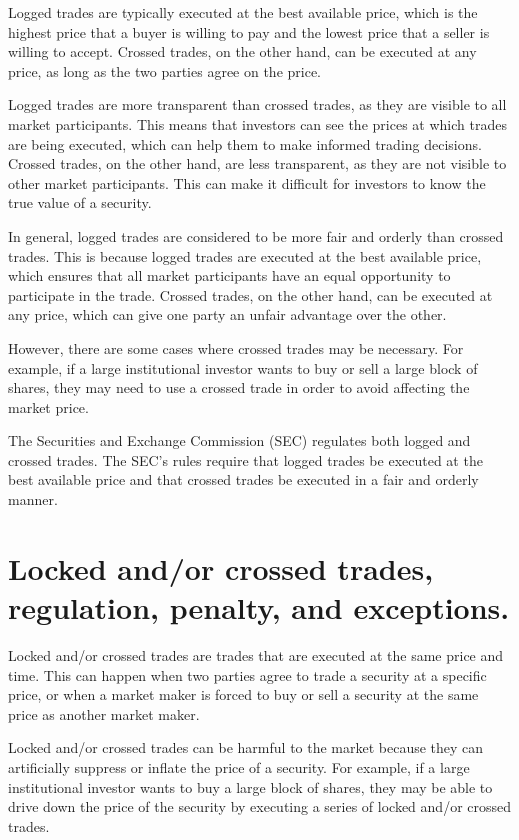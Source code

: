 \documentclass[11pt]{article}
\begin{document}
Logged trades are typically executed at the best available price, which is the highest price that a buyer is willing to pay and the lowest price that a seller is willing to accept. Crossed trades, on the other hand, can be executed at any price, as long as the two parties agree on the price.

Logged trades are more transparent than crossed trades, as they are visible to all market participants. This means that investors can see the prices at which trades are being executed, which can help them to make informed trading decisions. Crossed trades, on the other hand, are less transparent, as they are not visible to other market participants. This can make it difficult for investors to know the true value of a security.

In general, logged trades are considered to be more fair and orderly than crossed trades. This is because logged trades are executed at the best available price, which ensures that all market participants have an equal opportunity to participate in the trade. Crossed trades, on the other hand, can be executed at any price, which can give one party an unfair advantage over the other.

However, there are some cases where crossed trades may be necessary. For example, if a large institutional investor wants to buy or sell a large block of shares, they may need to use a crossed trade in order to avoid affecting the market price.

The Securities and Exchange Commission (SEC) regulates both logged and crossed trades. The SEC's rules require that logged trades be executed at the best available price and that crossed trades be executed in a fair and orderly manner.


\section{Locked and/or crossed trades, regulation, penalty, and exceptions.}
\label{sec:org80c6042}

Locked and/or crossed trades are trades that are executed at the same price and time. This can happen when two parties agree to trade a security at a specific price, or when a market maker is forced to buy or sell a security at the same price as another market maker.

Locked and/or crossed trades can be harmful to the market because they can artificially suppress or inflate the price of a security. For example, if a large institutional investor wants to buy a large block of shares, they may be able to drive down the price of the security by executing a series of locked and/or crossed trades.
\end{document}
